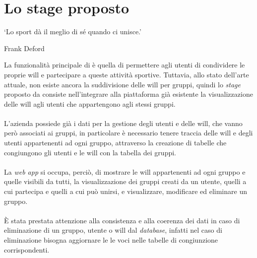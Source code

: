 \section{Lo stage proposto}
\epigraph{\label{eph: sport}\enquote*{Lo sport dà il meglio di sé quando ci
            unisce.}}{Frank Deford}
\noindent La funzionalità principale di \productName è quella di permettere agli utenti di condividere le proprie
\gls{will} e partecipare a queste attività sportive. Tuttavia, allo stato dell'arte attuale, non esiste ancora la suddivisione
delle \gls{will}
per gruppi, quindi lo \textit{stage} proposto da \myCompany consiste nell'integrare
alla piattaforma già esistente
la visualizzazione delle \gls{will} agli utenti che appartengono agli stessi
gruppi.\\ \\
L'azienda possiede già i dati per la gestione degli utenti e delle
\gls{will}, che vanno però associati ai gruppi, in particolare è necessario tenere
traccia delle \gls{will} e degli utenti appartenenti ad ogni gruppo, attraverso
la creazione di tabelle che congiungono gli
utenti e le \gls{will} con la tabella dei gruppi.\\ \\
La \textit{web app} si occupa, perciò, di mostrare le \gls{will} appartenenti
ad ogni gruppo e quelle visibili da tutti, la visualizzazione dei gruppi creati
da un utente, quelli a cui partecipa e quelli a cui può unirsi, e visualizzare,
modificare ed eliminare un gruppo. \\ \\
È stata prestata attenzione alla consistenza e alla coerenza dei dati in
caso di eliminazione di un gruppo, utente o \gls{will} dal \textit{database},
infatti nel caso di eliminazione bisogna aggiornare le le voci nelle tabelle di
congiunzione corrispondenti.

